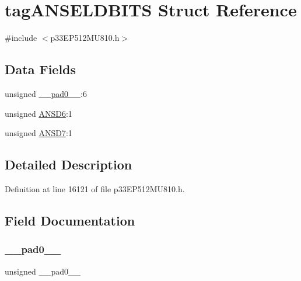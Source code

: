 \hypertarget{structtag_a_n_s_e_l_d_b_i_t_s}{}\section{tag\+A\+N\+S\+E\+L\+D\+B\+I\+TS Struct Reference}
\label{structtag_a_n_s_e_l_d_b_i_t_s}


{\ttfamily \#include $<$p33\+E\+P512\+M\+U810.\+h$>$}

\subsection*{Data Fields}
\begin{DoxyCompactItemize}
\item 
unsigned \hyperlink{structtag_a_n_s_e_l_d_b_i_t_s_adf71f3d8410c1f1dbbc96680a92c49af}{\+\_\+\+\_\+pad0\+\_\+\+\_\+}\+:6
\item 
unsigned \hyperlink{structtag_a_n_s_e_l_d_b_i_t_s_a29bb776bcfd6f982962d48de50986d8e}{A\+N\+S\+D6}\+:1
\item 
unsigned \hyperlink{structtag_a_n_s_e_l_d_b_i_t_s_a9962243f2338e3933bad1c7e68a5754b}{A\+N\+S\+D7}\+:1
\end{DoxyCompactItemize}


\subsection{Detailed Description}


Definition at line 16121 of file p33\+E\+P512\+M\+U810.\+h.



\subsection{Field Documentation}
\mbox{\label{structtag_a_n_s_e_l_d_b_i_t_s_adf71f3d8410c1f1dbbc96680a92c49af}} 
\subsubsection{\texorpdfstring{\+\_\+\+\_\+pad0\+\_\+\+\_\+}{\_\_pad0\_\_}}
{\footnotesize\ttfamily unsigned \+\_\+\+\_\+pad0\+\_\+\+\_\+}



